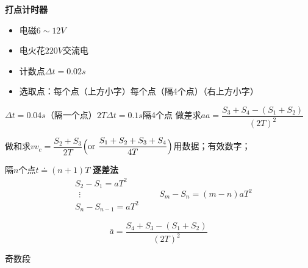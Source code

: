 \textbf{打点计时器}
\begin{itemize}
\item 电磁\quad $6\sim12\unit{V}$ %
\item 电火花\quad $220\unit{V}$\quad {}\quad 交流电 %
\end{itemize}


\begin{itemize}
\item 计数点\quad $\Delta t=0.02\unit{s}$ %
\item 选取点：每个点（上方小字）\quad 每个点（隔4个点）（右上方小字） %
\end{itemize}

\hspace{5em}$\Delta t=0.04\unit{s}$（隔一个点）$2T$\qquad\qquad $\Delta t=0.1\unit{s}$\quad 隔4个点
做差求$a$\quad $a=\dfrac{S_3+S_4-(S_1+S_2)}{(2T)^2}$

做和求$v$\quad $v_c=\dfrac{S_2+S_3}{2T}$\quad $\Bigl(\text{or}\ \dfrac{S_1+S_2+S_3+S_4}{4T}\Bigr)$\quad {}用数据；有效数字；

隔$n$个点\quad {}\quad $t\doteq(n+1)T$ %
\textbf{逐差法}
\[
\begin{aligned}
&S_2-S_1=aT^2\\
&\ \ \vdots\\
&S_n-S_{n-1}=aT^2
\end{aligned}
\qquad S_m-S_n=(m-n)aT^2
\]

\[
\bar a=\frac{S_4+S_3-(S_1+S_2)}{(2T)^2}
\]

奇数段


